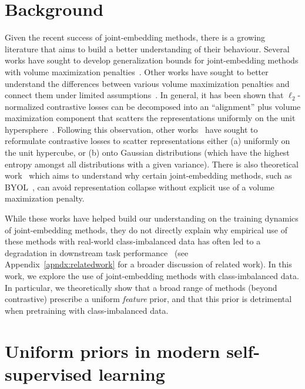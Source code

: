 \documentclass{article} %
\begin{document}

\section{Background}

Given the recent success of joint-embedding methods, there is a growing literature that aims to build a better understanding of their behaviour.
Several works have sought to develop generalization bounds for joint-embedding methods with volume maximization penalties~\citep{arora2019theoretical, balestriero2022contrastive}.
Other works have sought to better understand the differences between various volume maximization penalties and connect them under limited assumptions~\citep{garrido2022duality}.
In general, it has been shown that $\ell_2$-normalized contrastive losses can be decomposed into an ``alignment'' plus volume maximization component that scatters the representations uniformly on the unit hypersphere~\citep{wang2020understanding}.
Following this observation, other works~\citep{chen2021intriguing} have sought to reformulate contrastive losses to scatter representations either (a) uniformly on the unit hypercube, or (b) onto Gaussian distributions (which have the highest entropy amongst all distributions with a given variance).
There is also theoretical work~\citep{tian2021understanding} which aims to understand why certain joint-embedding methods, such as BYOL~\citep{grill2020bootstrap}, can avoid representation collapse without explicit use of a volume maximization penalty.

While these works have helped build our understanding on the training dynamics of joint-embedding methods, they do not directly explain why empirical use of these methods with real-world class-imbalanced data has often led to a degradation in downstream task performance~\citep{tian2021divide, goyal2022vision} (see Appendix~\ref{apndx:relatedwork} for a broader discussion of related work).
In this work, we explore the use of joint-embedding methods with class-imbalanced data.
In particular, we theoretically show that a broad range of methods (beyond contrastive) prescribe a uniform \emph{feature} prior, and that this prior is detrimental when pretraining with class-imbalanced data.

\section{Uniform priors in modern self-supervised learning}
\label{sec:theory}
\end{document}
